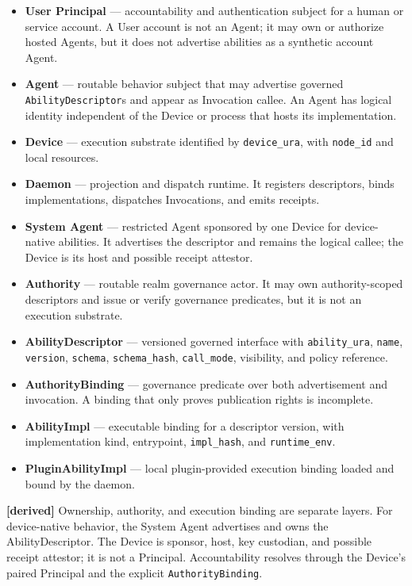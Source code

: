 \documentclass[11pt,a4paper]{article}
\newcommand{\derived}{\textcolor{derivedcolor}{\textbf{[derived]}}\xspace}
\begin{document}
\begin{itemize}[leftmargin=2em,itemsep=0.3em]
    \item \textbf{User Principal} --- accountability and authentication
    subject for a human or service account. A User account is not an Agent; it
    may own or authorize hosted Agents, but it does not advertise abilities as a
    synthetic account Agent.
    \item \textbf{Agent} --- routable behavior subject that may advertise
    governed \texttt{AbilityDescriptor}s and appear as Invocation callee. An
    Agent has logical identity independent of the Device or process that hosts
    its implementation.
    \item \textbf{Device} --- execution substrate identified by
    \texttt{device\_ura}, with \texttt{node\_id} and local resources.
    \item \textbf{Daemon} --- projection and dispatch runtime. It registers
    descriptors, binds implementations, dispatches Invocations, and emits
    receipts.
    \item \textbf{System Agent} --- restricted Agent sponsored by one Device
    for device-native abilities. It advertises the descriptor and remains the
    logical callee; the Device is its host and possible receipt attestor.
    \item \textbf{Authority} --- routable realm governance actor. It may own
    authority-scoped descriptors and issue or verify governance predicates, but
    it is not an execution substrate.
    \item \textbf{AbilityDescriptor} --- versioned governed interface with
    \texttt{ability\_ura}, \texttt{name}, \texttt{version}, \texttt{schema},
    \texttt{schema\_hash}, \texttt{call\_mode}, visibility, and policy
    reference.
    \item \textbf{AuthorityBinding} --- governance predicate over both
    advertisement and invocation. A binding that only proves publication
    rights is incomplete.
    \item \textbf{AbilityImpl} --- executable binding for a descriptor version,
    with implementation kind, entrypoint, \texttt{impl\_hash}, and
    \texttt{runtime\_env}.
    \item \textbf{PluginAbilityImpl} --- local plugin-provided execution
    binding loaded and bound by the daemon.
\end{itemize}

\derived{} Ownership, authority, and execution binding are separate layers.
For device-native behavior, the System Agent advertises and owns the
AbilityDescriptor. The Device is sponsor, host, key custodian, and possible
receipt attestor; it is not a Principal. Accountability resolves through the
Device's paired Principal and the explicit \texttt{AuthorityBinding}.
\end{document}
